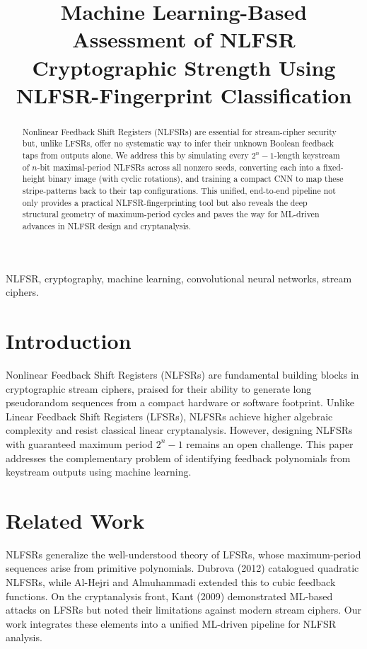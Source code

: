 \documentclass[conference]{IEEEtran}
\title{Machine Learning-Based Assessment of NLFSR Cryptographic Strength Using NLFSR-Fingerprint Classification}
\author{
  \IEEEauthorblockN{Sultan Almuhammadi, Abdulmumin Sa'ad and Mohammed Mansour}
  \IEEEauthorblockA{
    Department of Computer Engineering,\\
    King Fahd University of Petroleum and Minerals,\\
    Dhahran, Saudi Arabia\\
    Email: \{muhamadi, g202203620, g202423860\}@kfupm.edu.sa
  }
}
\begin{document}
\maketitle

\begin{abstract}
Nonlinear Feedback Shift Registers (NLFSRs) are essential for stream-cipher security but, unlike LFSRs, offer no systematic way to infer their unknown Boolean feedback taps from outputs alone. We address this by simulating every $2^{n}-1$-length keystream of $n$-bit maximal-period NLFSRs across all nonzero seeds, converting each into a fixed-height binary image (with cyclic rotations), and training a compact CNN to map these stripe-patterns back to their tap configurations. This unified, end-to-end pipeline not only provides a practical NLFSR-fingerprinting tool but also reveals the deep structural geometry of maximum-period cycles and paves the way for ML-driven advances in NLFSR design and cryptanalysis.
\end{abstract}

\begin{IEEEkeywords}
NLFSR, cryptography, machine learning, convolutional neural networks, stream ciphers.
\end{IEEEkeywords}

\section{Introduction}
Nonlinear Feedback Shift Registers (NLFSRs) are fundamental building blocks in cryptographic stream ciphers, praised for their ability to generate long pseudorandom sequences from a compact hardware or software footprint. Unlike Linear Feedback Shift Registers (LFSRs), NLFSRs achieve higher algebraic complexity and resist classical linear cryptanalysis. However, designing NLFSRs with guaranteed maximum period $2^{n}-1$ remains an open challenge. This paper addresses the complementary problem of identifying feedback polynomials from keystream outputs using machine learning.

\section{Related Work}
NLFSRs generalize the well-understood theory of LFSRs, whose maximum-period sequences arise from primitive polynomials. Dubrova (2012) catalogued quadratic NLFSRs, while Al-Hejri and Almuhammadi extended this to cubic feedback functions. On the cryptanalysis front, Kant (2009) demonstrated ML-based attacks on LFSRs but noted their limitations against modern stream ciphers. Our work integrates these elements into a unified ML-driven pipeline for NLFSR analysis.
\end{document}
